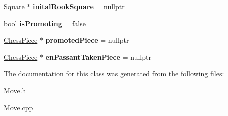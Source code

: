\begin{DoxyCompactItemize}
\mbox{\label{class_move_a0be40463b39204457c4c2a331403ad49}} 
\mbox{\hyperlink{class_square}{Square}} $\ast$ {\bfseries inital\+Rook\+Square} = nullptr
\item 
\mbox{\label{class_move_a07f0eb12d13ed4f65c0dcc65946f583c}} 
bool {\bfseries is\+Promoting} = false
\item 
\mbox{\label{class_move_ae947bead41a531a56957916b007cdfb4}} 
\mbox{\hyperlink{class_chess_piece}{Chess\+Piece}} $\ast$ {\bfseries promoted\+Piece} = nullptr
\item 
\mbox{\label{class_move_a8373efdfa68c28e953d337b95b946c08}} 
\mbox{\hyperlink{class_chess_piece}{Chess\+Piece}} $\ast$ {\bfseries en\+Passant\+Taken\+Piece} = nullptr
\end{DoxyCompactItemize}


The documentation for this class was generated from the following files\+:\begin{DoxyCompactItemize}
\item 
Move.\+h\item 
Move.\+cpp\end{DoxyCompactItemize}
